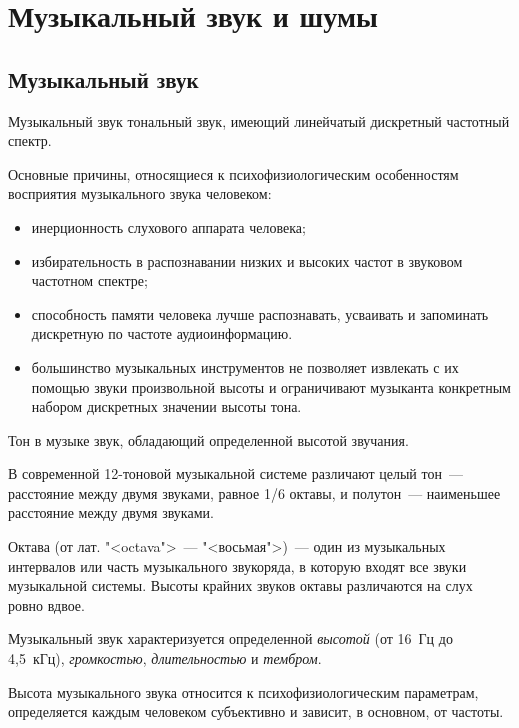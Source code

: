 \documentclass{beamer}
\begin{document}
\section{Музыкальный звук и шумы}
\subsection{Музыкальный звук}
\begin{frame}
  \begin{block}{Музыкальный звук}
  тональный звук, имеющий линейчатый дискретный частотный спектр. 
  \end{block}
Основные причины, относящиеся к психофизиологическим особенностям восприятия музыкального звука человеком: 
\begin{itemize}
\item инерционность слухового аппарата человека;
\item избирательность в распознавании низких и высоких частот в звуковом частотном спектре;
\item способность памяти человека лучше распознавать, усваивать и запоминать дискретную по частоте аудиоинформацию.
\item большинство музыкальных инструментов не позволяет извлекать с их помощью звуки произвольной высоты и ограничивают музыканта конкретным набором дискретных значении высоты тона.
\end{itemize}
\end{frame}

\begin{frame}
  \begin{block}{Тон в музыке}
    звук, обладающий определенной высотой звучания. 
  \end{block}  
  В современной 12-тоновой музыкальной системе различают целый тон~--- расстояние между двумя звуками, равное 1/6 октавы, и полутон~--- наименьшее расстояние между двумя звуками.
  \begin{block}{Октава}
(от лат. "<octava">~--- "<восьмая">)~--- один из музыкальных интервалов или часть музыкального звукоряда, в которую входят все звуки музыкальной системы. Высоты крайних звуков октавы различаются на слух ровно вдвое.
  \end{block}
Музыкальный звук характеризуется определенной {\itshape высотой} (от 16~Гц до 4,5~кГц), {\itshape громкостью}, {\itshape длительностью} и {\itshape тембром}. 
  \begin{block}{Высота музыкального звука}
относится к психофизиологическим параметрам, определяется каждым человеком субъективно и зависит, в основном, от частоты. 
  \end{block}
\end{frame}
\end{document}
